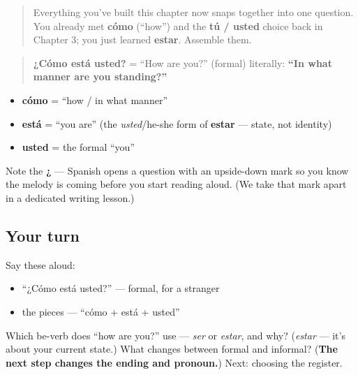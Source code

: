 \label{lesson:ES-C04-como-esta}



\begin{quote}
Everything you've built this chapter now snaps together into one question. You already met \textbf{cómo} (\textquotedblleft{}how\textquotedblright{}) and the \textbf{tú / usted} choice back in Chapter 3; you just learned \textbf{estar}. Assemble them.
\end{quote}

\begin{cousinweb}
\begin{quote}
\textbf{¿Cómo está usted?} = \textquotedblleft{}How are you?\textquotedblright{} (formal) literally: \textbf{\textquotedblleft{}In what manner are you standing?\textquotedblright{}}
\end{quote}

\begin{itemize}
\raggedright
  \item \textbf{cómo} = \textquotedblleft{}how / in what manner\textquotedblright{}
  \item \textbf{está} = \textquotedblleft{}you are\textquotedblright{} (the \emph{usted}/he-she form of \textbf{estar} — state, not identity)
  \item \textbf{usted} = the formal \textquotedblleft{}you\textquotedblright{}
\end{itemize}

Note the \textbf{¿} — Spanish opens a question with an upside-down mark so you know the melody is coming before you start reading aloud. (We take that mark apart in a dedicated writing lesson.)
\end{cousinweb}

\subsection*{Your turn}
Say these aloud:

\begin{itemize}
\raggedright
  \item \textquotedblleft{}¿Cómo está usted?\textquotedblright{} — formal, for a stranger
  \item the pieces — \textquotedblleft{}cómo + está + usted\textquotedblright{}
\end{itemize}

\begin{tcolorbox}[breakable,colback=teal!4,colframe=teal!35!black,title={Before you move on}]
Which be-verb does \textquotedblleft{}how are you?\textquotedblright{} use — \emph{ser} or \emph{estar}, and why? (\emph{estar} — it's about your current state.) What changes between formal and informal? (\textbf{The next step changes the ending and pronoun.}) Next: choosing the register.
\end{tcolorbox}
